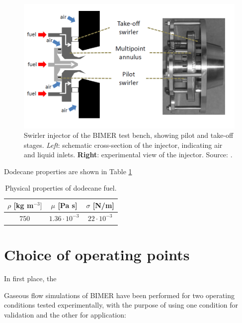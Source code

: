 \begin{figure}[h!]
	\centering
	\includegraphics[scale=0.7]{./part3_applications/figures_ch7_aero/BIMER_swirler}
	\caption{Swirler injector of the BIMER test bench, showing pilot and take-off stages. \textsl{Left}: schematic cross-section of the injector, indicating air and liquid inlets. \textbf{Right}: experimental view of the injector. Source: .}
	\label{fig:BIMER_swirler}
\end{figure}



Dodecane properties are shown in Table \ref{tab:dodecane_properties}

\begin{table}[!h]
\centering
\caption{Physical properties of dodecane fuel.}
\begin{tabular}{|c|c|c|}
\hline
$\rho$ [kg m$^{-3}]$   & $\mu$ [Pa s]   & $\sigma$ [N/m]  \\
\hline
750 & $1.36 \cdot 10^{-3}$ & $22 \cdot 10^{-3}$ \\
\hline
\end{tabular}
\label{tab:dodecane_properties}
\end{table}


\section{Choice of operating points}



In first place, the 

Gaseous flow simulations of BIMER have been performed for two operating conditions tested experimentally, with the purpose of using one condition for validation and the other for application:


